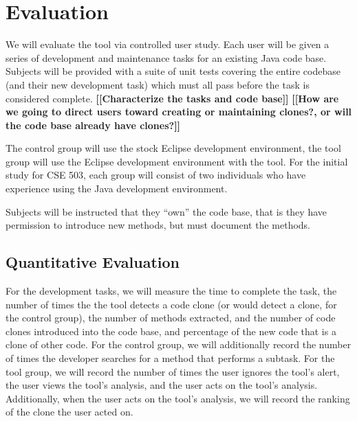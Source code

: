 \documentclass[preprint,10pt]{sigplanconf}
\newcommand{\todo}[1]{{\bfseries [[#1]]}}
\begin{document}
\section{Evaluation}


We will evaluate the tool via controlled user study. Each user will be given
a series of development and maintenance tasks for an existing Java
code base. Subjects will be provided with a suite of unit tests covering the
entire codebase (and their new development task) which must all pass
before the task is considered complete.
\todo{Characterize the tasks and code base} 
\todo{How are we going to direct users toward creating or maintaining
  clones?, or will the code base already have clones?}

The control group will use the stock Eclipse development
environment, the tool group will use the Eclipse development
environment with the tool. For the initial study for CSE 503, each
group will consist of two individuals who have experience using the
Java development environment.  

Subjects will be instructed that they ``own'' the code base, that is they
have permission to introduce new methods, but must document the
methods.  

\subsection{Quantitative Evaluation}
For the development tasks, we will measure the time to complete the
task, the number of times the the tool detects a code clone (or would
detect a clone, for the control group),
the number of methods extracted, and the number of code clones
introduced into the code base, and percentage of the new code that is
a clone of other code. 
For the control group, we will additionally
record the number of times the developer searches for a method that
performs a subtask. 
For the tool group, we will record the number of
times the user ignores the tool's
alert, the user views the tool's analysis, and the user acts on the
tool's analysis. Additionally, when the user acts on the tool's
analysis, we will record the ranking of the clone the user acted on.
\end{document}
